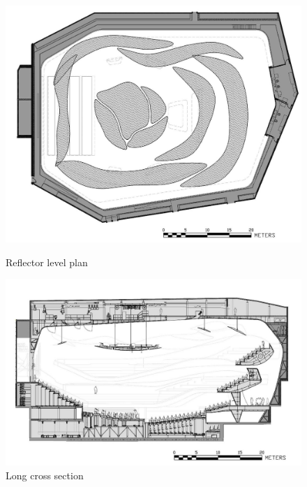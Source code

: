 \begin{figure}[htbp]
 \begin{minipage}{0.5\hsize}
  \begin{center}
   \includegraphics[scale=0.15]{01_att/PLAN_Reflector_Level.png}
  \end{center}
  \caption{\hspace{1mm}Reflector level plan}
 \end{minipage}
 \begin{minipage}{0.5\hsize}
  \begin{center}
   \includegraphics[scale=0.15]{01_att/SECTION_Long.png}
  \end{center}
  \caption{\hspace{1mm}Long cross section}
 \end{minipage}
\end{figure}
